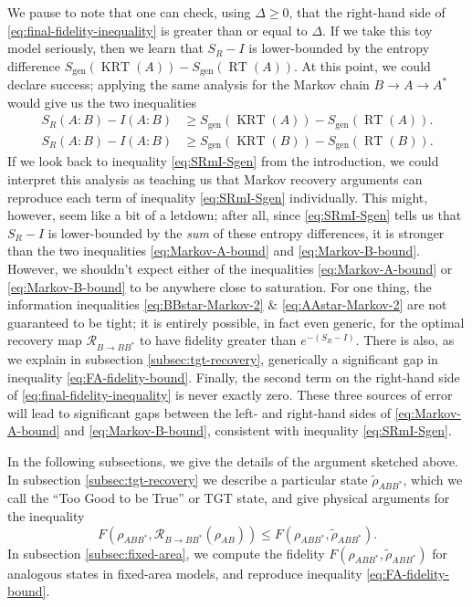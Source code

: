 \documentclass[a4paper,11pt]{article}
\renewcommand{\tilde}{\widetilde}
\newcommand{\RT}{\operatorname{RT}}
\newcommand{\KRT}{\operatorname{KRT}}
\begin{document}
We pause to note that one can check, using $\Delta \geq 0$, that the right-hand side of \eqref{eq:final-fidelity-inequality} is greater than or equal to $\Delta$. If we take this toy model seriously, then we learn that $S_R - I$ is lower-bounded by the entropy difference $S_{\text{gen}}(\KRT(A)) - S_{\text{gen}}(\RT(A))$. At this point, we could declare success; applying the same analysis for the Markov chain $B \rightarrow A \rightarrow A^*$ would give us the two inequalities
\begin{align}
    S_R(A:B) - I(A:B)
        & \geq S_{\text{gen}}(\KRT(A)) - S_{\text{gen}}(\RT(A)). \label{eq:Markov-A-bound} \\
    S_R(A:B) - I(A:B) 
        & \geq S_{\text{gen}}(\KRT(B)) - S_{\text{gen}}(\RT(B)). \label{eq:Markov-B-bound}
\end{align}
If we look back to inequality \eqref{eq:SRmI-Sgen} from the introduction, we could interpret this analysis as teaching us that Markov recovery arguments can reproduce each term of inequality \eqref{eq:SRmI-Sgen} individually. This might, however, seem like a bit of a letdown; after all, since \eqref{eq:SRmI-Sgen} tells us that $S_R - I$ is lower-bounded by the \emph{sum} of these entropy differences, it is stronger than the two inequalities \eqref{eq:Markov-A-bound} and \eqref{eq:Markov-B-bound}. However, we shouldn't expect either of the inequalities \eqref{eq:Markov-A-bound} or \eqref{eq:Markov-B-bound} to be anywhere close to saturation. For one thing, the information inequalities \eqref{eq:BBstar-Markov-2} \& \eqref{eq:AAstar-Markov-2} are not guaranteed to be tight; it is entirely possible, in fact even generic, for the optimal recovery map $\mathcal{R}_{B \rightarrow BB^*}$ to have fidelity greater than $e^{-(S_R - I)}.$ There is also, as we explain in subsection \ref{subsec:tgt-recovery}, generically a significant gap in inequality \eqref{eq:FA-fidelity-bound}. Finally, the second term on the right-hand side of \eqref{eq:final-fidelity-inequality} is never exactly zero. These three sources of error will lead to significant gaps between the left- and right-hand sides of \eqref{eq:Markov-A-bound} and \eqref{eq:Markov-B-bound}, consistent with inequality \eqref{eq:SRmI-Sgen}.

In the following subsections, we give the details of the argument sketched above. In subsection \ref{subsec:tgt-recovery} we describe a particular state $\tilde{\rho}_{ABB^*}$, which we call the ``Too Good to be True'' or TGT state, and give physical arguments for the inequality
\begin{equation}
    F(\rho_{ABB^*}, \mathcal{R}_{B \rightarrow B B^*}(\rho_{AB})) \leq F(\rho_{ABB^*}, \tilde{\rho}_{ABB^*}).
\end{equation}
In subsection \ref{subsec:fixed-area}, we compute the fidelity $F(\rho_{ABB^*}, \tilde{\rho}_{ABB^*})$ for analogous states in fixed-area models, and reproduce inequality \eqref{eq:FA-fidelity-bound}.
\end{document}
